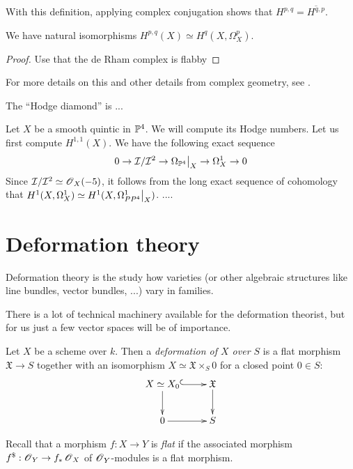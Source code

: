 \documentclass[]{uiophd}
\begin{document}
With this definition, applying complex conjugation shows that $H^{p,q}=\overline{H^{q,p}}$.

\begin{lemma}
We have natural isomorphisms $H^{p,q}(X) \simeq H^q(X,\Omega_X^p)$. 
\end{lemma}
\begin{proof}
Use that the de Rham complex is flabby
\end{proof}

For more details on this and other details from complex geometry, see  \cite{voisin_complexalg}.

The ``Hodge diamond'' is 
...

\begin{example}
Let $X$ be a smooth quintic in $\mathbb{P}^4$. We will compute its Hodge numbers. Let us first compute $H^{1,1}(X)$. We have the following exact sequence
$$
0 \to \mathcal I/\mathcal I^2 \to \restr{\Omega_{\PP^4}}{X} \to \Omega_X^1 \to 0
$$
Since $\mathcal I/\mathcal I^2 \simeq \operatorname{\mathscr{O}}_X(-5)$, it follows from the long exact sequence of cohomology that $H^1(X,\Omega^1_X) \simeq H^1(X, \restr{\Omega^1_{PP^4}}{X})$. 
....
\end{example}

\section{Deformation theory}

Deformation theory is the study how varieties (or other algebraic structures like line bundles, vector bundles, ...) vary in families. 

There is a lot of technical machinery available for the deformation theorist, but for us just a few vector spaces will be of importance.

\begin{defi}
Let $X$ be a scheme over $k$. Then a \emph{deformation of $X$ over $S$} is a flat morphism $\mathfrak X \to S$ together with an isomorphism $X \simeq \mathfrak X \times_S 0$ for a closed point $0 \in S$:
$$
\xymatrix{
X \simeq X_0 \ar@{^{(}->}[r] \ar[d] &  \mathfrak X \ar[d] \\
0 \ar[r] & S
}
$$
\end{defi}

Recall that a morphism $f:X \to Y$ is \emph{flat} if the associated morphism $f^{\$}:\operatorname{\mathscr{O}}_Y \to f_\ast \operatorname{\mathscr{O}}_X$ of $\operatorname{\mathscr{O}}_Y$-modules is a flat morphism.


\end{document}
